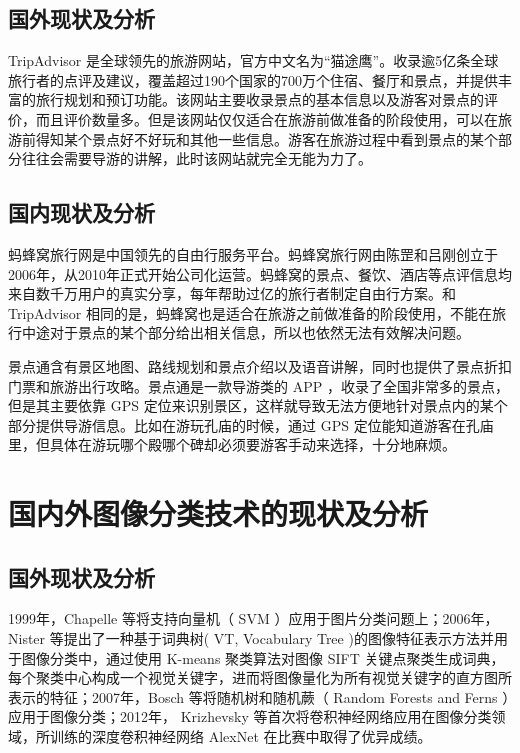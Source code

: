 		\subsection{国外现状及分析}
	
			TripAdvisor 是全球领先的旅游网站，官方中文名为“猫途鹰”。收录逾5亿条全球旅行者的点评及建议，覆盖超过190个国家的700万个住宿、餐厅和景点，并提供丰富的旅行规划和预订功能。该网站主要收录景点的基本信息以及游客对景点的评价，而且评价数量多。但是该网站仅仅适合在旅游前做准备的阶段使用，可以在旅游前得知某个景点好不好玩和其他一些信息。游客在旅游过程中看到景点的某个部分往往会需要导游的讲解，此时该网站就完全无能为力了。
	
		\subsection{国内现状及分析}
	
			蚂蜂窝旅行网是中国领先的自由行服务平台。蚂蜂窝旅行网由陈罡和吕刚创立于2006年，从2010年正式开始公司化运营。蚂蜂窝的景点、餐饮、酒店等点评信息均来自数千万用户的真实分享，每年帮助过亿的旅行者制定自由行方案。和 TripAdvisor 相同的是，蚂蜂窝也是适合在旅游之前做准备的阶段使用，不能在旅行中途对于景点的某个部分给出相关信息，所以也依然无法有效解决问题。
		
			景点通含有景区地图、路线规划和景点介绍以及语音讲解，同时也提供了景点折扣门票和旅游出行攻略。景点通是一款导游类的 APP ，收录了全国非常多的景点，但是其主要依靠 GPS 定位来识别景区，这样就导致无法方便地针对景点内的某个部分提供导游信息。比如在游玩孔庙的时候，通过 GPS 定位能知道游客在孔庙里，但具体在游玩哪个殿哪个碑却必须要游客手动来选择，十分地麻烦。
	
	\section{国内外图像分类技术的现状及分析}
	
		\subsection{国外现状及分析}
		
			1999年，Chapelle 等将支持向量机（ SVM ）应用于图片分类问题上；2006年，Nister 等提出了一种基于词典树( VT, Vocabulary Tree )的图像特征表示方法并用于图像分类中，通过使用 K-means 聚类算法对图像 SIFT 关键点聚类生成词典，每个聚类中心构成一个视觉关键字，进而将图像量化为所有视觉关键字的直方图所表示的特征；2007年，Bosch 等将随机树和随机蕨（ Random Forests and Ferns ）应用于图像分类；2012年， Krizhevsky 等首次将卷积神经网络应用在图像分类领域，所训练的深度卷积神经网络 AlexNet 在比赛中取得了优异成绩。
	
